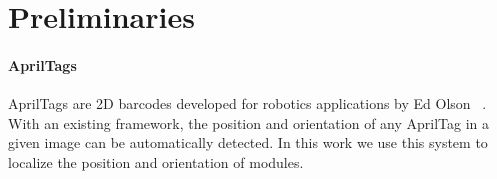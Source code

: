 \section{Preliminaries}\label{prelim}

\paragraph{AprilTags} AprilTags are 2D barcodes developed for robotics applications by Ed Olson ~\cite{Olson11}. With an existing framework, the position and orientation of any AprilTag in a given image can be automatically detected. In this work we use this system to localize the position and orientation of modules.
